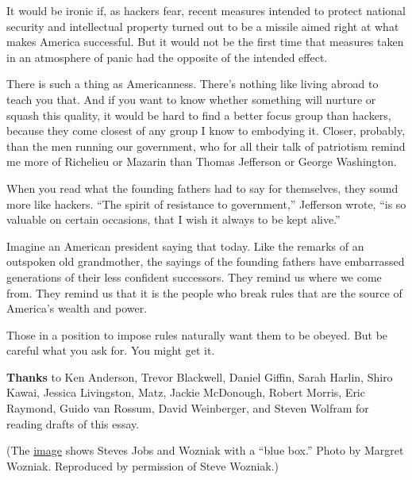 It would be ironic if, as hackers fear, recent measures intended to
protect national security and intellectual property turned out to be a
missile aimed right at what makes America successful. But it would not
be the first time that measures taken in an atmosphere of panic had the
opposite of the intended effect.

There is such a thing as Americanness. There's nothing like living
abroad to teach you that. And if you want to know whether something will
nurture or squash this quality, it would be hard to find a better focus
group than hackers, because they come closest of any group I know to
embodying it. Closer, probably, than the men running our government, who
for all their talk of patriotism remind me more of Richelieu or Mazarin
than Thomas Jefferson or George Washington.

When you read what the founding fathers had to say for themselves, they
sound more like hackers. ``The spirit of resistance to government,''
Jefferson wrote, ``is so valuable on certain occasions, that I wish it
always to be kept alive.''

Imagine an American president saying that today. Like the remarks of an
outspoken old grandmother, the sayings of the founding fathers have
embarrassed generations of their less confident successors. They remind
us where we come from. They remind us that it is the people who break
rules that are the source of America's wealth and power.

Those in a position to impose rules naturally want them to be obeyed.
But be careful what you ask for. You might get it.

\textbf{Thanks} to Ken Anderson, Trevor Blackwell, Daniel Giffin, Sarah
Harlin, Shiro Kawai, Jessica Livingston, Matz, Jackie McDonough, Robert
Morris, Eric Raymond, Guido van Rossum, David Weinberger, and Steven
Wolfram for reading drafts of this essay.

(The \href{bluebox.html}{image} shows Steves Jobs and Wozniak with a
``blue box.'' Photo by Margret Wozniak. Reproduced by permission of
Steve Wozniak.)